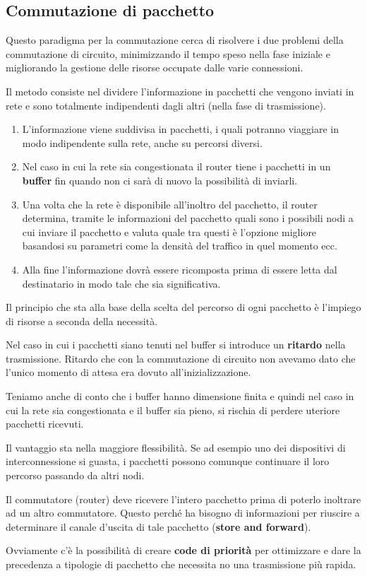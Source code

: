 \subsection{Commutazione di pacchetto}
Questo paradigma per la commutazione cerca di risolvere i due problemi 
della commutazione di circuito, minimizzando il tempo speso nella fase
iniziale e migliorando la gestione delle risorse occupate dalle varie 
connessioni.

Il metodo consiste nel dividere l'informazione in pacchetti che vengono
inviati in rete e sono totalmente indipendenti dagli altri (nella fase 
di trasmissione).
\begin{enumerate}
	\item L'informazione viene suddivisa in pacchetti, i quali potranno
		viaggiare in modo indipendente sulla rete, anche su percorsi 
		diversi.
	\item Nel caso in cui la rete sia congestionata il router tiene i
		pacchetti in un \textbf{buffer} fin quando non ci sarà di 
		nuovo la possibilità di inviarli.
	\item Una volta che la rete è disponibile all'inoltro del 
		pacchetto, il router determina, tramite le informazioni del 
		pacchetto quali sono i possibili nodi a cui inviare il
		pacchetto e valuta quale tra questi è l'opzione migliore
		basandosi su parametri come la densità del traffico in quel 
		momento ecc. 
	\item Alla fine l'informazione dovrà essere ricomposta prima di 
		essere letta dal destinatario in modo tale che sia
		significativa.
\end{enumerate}
Il principio che sta alla base della scelta del percorso di ogni 
pacchetto è l'impiego di risorse a seconda della necessità.

Nel caso in cui i pacchetti siano tenuti nel buffer si introduce un 
\textbf{ritardo} nella trasmissione. Ritardo che con la commutazione 
di circuito non avevamo dato che l'unico momento di attesa era dovuto 
all'inizializzazione.

Teniamo anche di conto che i buffer hanno dimensione finita e quindi 
nel caso in cui la rete sia congestionata e il buffer sia pieno, si 
rischia di perdere uteriore pacchetti ricevuti.

Il vantaggio sta nella maggiore flessibilità. Se ad esempio uno dei 
dispositivi di interconnessione si guasta, i pacchetti possono 
comunque continuare il loro percorso passando da altri nodi.

Il commutatore (router) deve ricevere l'intero pacchetto prima di 
poterlo inoltrare ad un altro commutatore. Questo perché ha bisogno 
di informazioni per riuscire a determinare il canale d'uscita di tale 
pacchetto (\textbf{store and forward}).

Ovviamente c'è la possibilità di creare \textbf{code di priorità} per 
ottimizzare e dare la precedenza a tipologie di pacchetto che necessita
no una trasmissione più rapida.

